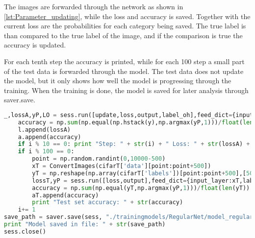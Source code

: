 The images are forwarded through the network as shown in \ref{lst:Parameter_updating}, while the loss and accuracy is saved. Together with the current loss are the probabilities for each category being saved. The true label is than compared to the true label of the image, and if the comparison is true the accuracy is updated.

For each tenth step the accuracy is printed, while for each 100 step a small part of the test data is forwarded through the model. The test data does not update the model, but it only shows how well the model is progressing through the training. When the training is done, the model is saved for later analysis through saver.save.

\begin{lstlisting}[language=Python, label=lst:Parameter_updating, caption=Parameter updating: loss and accuracy are saved and they are tested every 100 steps]
	_,lossA,yP,LO = sess.run([update,loss,output,label_oh],feed_dict={input_layer:x,label_layer:np.hstack(y)})
	accuracy = np.sum(np.equal(np.hstack(y),np.argmax(yP,1)))/float(len(y))
	l.append(lossA)
	a.append(accuracy)
	if i % 10 == 0: print "Step: " + str(i) + " Loss: " + str(lossA) + " Accuracy: " + str(accuracy)
	if i % 100 == 0: 
		point = np.random.randint(0,10000-500)
		xT = ConvertImages(cifarT['data'][point:point+500]) 
		yT = np.reshape(np.array(cifarT['labels'])[point:point+500],[500])
		lossT,yP = sess.run([loss,output],feed_dict={input_layer:xT,label_layer:yT})
		accuracy = np.sum(np.equal(yT,np.argmax(yP,1)))/float(len(yT))
		aT.append(accuracy)
		print "Test set accuracy: " + str(accuracy)
	i+= 1
save_path = saver.save(sess, "./trainingmodels/RegularNet/model_regularnet.ckpt")
print "Model saved in file: " + str(save_path)
sess.close()
\end{lstlisting}



